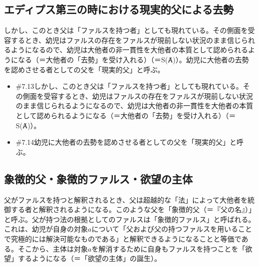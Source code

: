 \subsection{エディプス第三の時における現実的父による去勢}\label{ux30a8ux30c7ux30a3ux30d7ux30b9ux7b2cux4e09ux306eux6642ux306bux304aux3051ux308bux73feux5b9fux7684ux7236ux306bux3088ux308bux53bbux52e2}

しかし、このとき父は「ファルスを持つ者」としても現れている。その側面を受容するとき、幼児はファルスの存在をファルスが現前しない状況のまま信じられるようになるので、幼児は大他者の非一貫性を大他者の本質として認められるようになる（＝大他者の「去勢」を受け入れる）（＝S(Ⱥ)）。幼児に大他者の去勢を認めさせる者としての父を「現実的父」と呼ぶ。

\begin{note}{}
  \begin{itemize}
    \tightlist
    \item{\#7.13}しかし、このとき父は「ファルスを持つ者」としても現れている。その側面を受容するとき、幼児はファルスの存在をファルスが現前しない状況のまま信じられるようになるので、幼児は大他者の非一貫性を大他者の本質として認められるようになる（＝大他者の「去勢」を受け入れる）（＝S(Ⱥ)）。
    \item{\#7.14}幼児に大他者の去勢を認めさせる者としての父を「現実的父」と呼ぶ。
  \end{itemize}
\end{note}

\subsection{象徴的父・象徴的ファルス・欲望の主体}\label{ux8c61ux5fb4ux7684ux7236ux8c61ux5fb4ux7684ux30d5ux30a1ux30ebux30b9ux6b32ux671bux306eux4e3bux4f53}

父がファルスを持つと解釈されるとき、父は超越的な「法」によって大他者を統御する者と解釈されるようになる。このような父を「象徴的父（＝『父の名』）」と呼ぶ。父が持つ法の根拠としてのファルスは「象徴的ファルス」と呼ばれる。これは、幼児が自身の対象\(a\)について「父および父の持つファルスを用いることで究極的には解決可能なものである」と解釈できるようになることと等価である。そこから、主体は対象\(a\)を解消するために自身もファルスを持つことを「欲望」するようになる（＝「欲望の主体」の誕生）。

